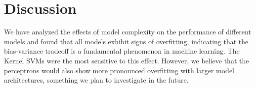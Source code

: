 \documentclass[11pt]{article}
\begin{document}


\section{Discussion}
We have analyzed the effects of model complexity on the performance of different models and found that all models exhibit signs of overfitting, indicating that the bias-variance tradeoff is a fundamental phenomenon in machine learning. The Kernel SVMs were the most sensitive to this effect. However, we believe that the perceptrons would also show more pronounced overfitting with larger model architectures, something we plan to investigate in the future. 
\end{document}
